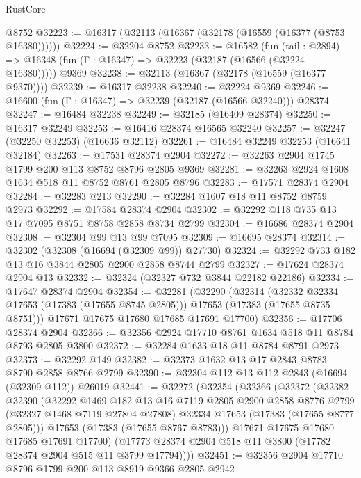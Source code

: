 \begin{lexlean}{RustCore}
\begin{coremodule}
    @8752
@32223 := @16317 (@32113 (@16367 (@32178 (@16559 (@16377 (@8753 @16380))))))
@32224 := @32204 @8752
@32233 := @16582
    (fun (tail : @2894) => @16348 (fun (Γ : @16347) => @32223 (@32187 (@16566 (@32224 @16380)))))
    @9369
@32238 := @32113 (@16367 (@32178 (@16559 (@16377 @9370))))
@32239 := @16317 @32238
@32240 := @32224 @9369
@32246 := @16600 (fun (Γ : @16347) => @32239 (@32187 (@16566 @32240))) @28374
@32247 := @16484 @32238
@32249 := @32185 (@16409 @28374)
@32250 := @16317 @32249
@32253 := @16416 @28374 @16565 @32240
@32257 := @32247 (@32250 @32253) (@16636 @32112)
@32261 := @16484 @32249 @32253 (@16641 @32184)
@32263 := @17531 @28374 @2904
@32272 := @32263 @2904 @1745 @1799 @200 @113 @8752 @8796 @2805 @9369
@32281 := @32263 @2924 @1608 @1634 @518 @11 @8752 @8761 @2805 @8796
@32283 := @17571 @28374 @2904
@32284 := @32283 @213
@32290 := @32284 @1607 @18 @11 @8752 @8759 @2973
@32292 := @17584 @28374 @2904
@32302 := @32292 @118 @735 @13 @17 @7095 @8751 @8758 @2858 @8734 @2799
@32304 := @16686 @28374 @2904
@32308 := @32304 @99 @13 @99 @7095
@32309 := @16695 @28374
@32314 := @32302 (@32308 (@16694 (@32309 @99)) @27730)
@32324 := @32292 @733 @182 @13 @16 @3844 @2805 @2900 @2858 @8744 @2799
@32327 := @17624 @28374 @2904 @13
@32332 := @32324 (@32327 @732 @3844 @22182 @22186)
@32334 := @17647 @28374 @2904
@32354 := @32281
    (@32290
      (@32314
        (@32332 @32334 @17653 (@17383 (@17655 @8745 @2805)))
        @17653
        (@17383 (@17655 @8735 @8751)))
      @17671
      @17675
      @17680
      @17685
      @17691
      @17700)
@32356 := @17706 @28374 @2904
@32366 := @32356 @2924 @17710 @8761 @1634 @518 @11 @8784 @8793 @2805 @3800
@32372 := @32284 @1633 @18 @11 @8784 @8791 @2973
@32373 := @32292 @149
@32382 := @32373 @1632 @13 @17 @2843 @8783 @8790 @2858 @8766 @2799
@32390 := @32304 @112 @13 @112 @2843 (@16694 (@32309 @112)) @26019
@32441 := @32272
    (@32354
      (@32366
        (@32372
          (@32382
            @32390
            (@32292
              @1469
              @182
              @13
              @16
              @7119
              @2805
              @2900
              @2858
              @8776
              @2799
              (@32327 @1468 @7119 @27804 @27808)
              @32334
              @17653
              (@17383 (@17655 @8777 @2805)))
            @17653
            (@17383 (@17655 @8767 @8783)))
          @17671
          @17675
          @17680
          @17685
          @17691
          @17700)
        (@17773 @28374 @2904 @518 @11 @3800 (@17782 @28374 @2904 @515 @11 @3799 @17794))))
@32451 := @32356 @2904 @17710 @8796 @1799 @200 @113 @8919 @9366 @2805 @2942

\end{coremodule}
\end{lexlean}
